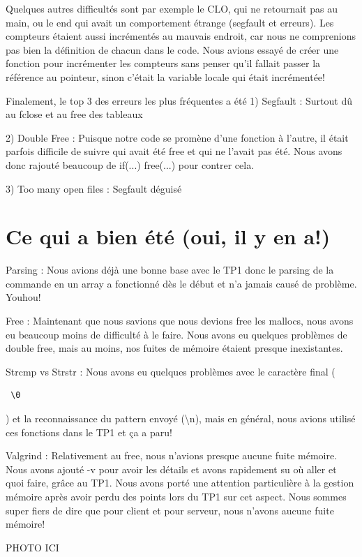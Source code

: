 \documentclass[11pt]{article}
\begin{document}
Quelques autres difficultés sont par exemple le CLO, qui ne retournait pas au main, ou le end qui avait un comportement étrange (segfault et erreurs). Les compteurs étaient aussi incrémentés au mauvais endroit, car nous ne comprenions pas bien la définition de chacun dans le code. Nous avions essayé de créer une fonction pour incrémenter les compteurs sans penser qu’il fallait passer la référence au pointeur, sinon c’était la variable locale qui était incrémentée!

Finalement, le top 3 des erreurs les plus fréquentes a été
1) Segfault : Surtout dû au fclose et au free des tableaux

2) Double Free : Puisque notre code se promène d’une fonction à l’autre, il était parfois difficile de suivre qui avait été free et qui ne l’avait pas été. Nous avons donc rajouté beaucoup de if(...) free(...) pour contrer cela.

3) Too many open files : Segfault déguisé


\section{Ce qui a bien été (oui, il y en a!)}

Parsing : Nous avions déjà une bonne base avec le TP1 donc le parsing de la commande en un array a fonctionné dès le début et n’a jamais causé de problème. Youhou!

Free : Maintenant que nous savions que nous devions free les mallocs, nous avons eu beaucoup moins de difficulté à le faire. Nous avons eu quelques problèmes de double free, mais au moins, nos fuites de mémoire étaient presque inexistantes.

Strcmp vs Strstr : Nous avons eu quelques problèmes avec le caractère final (\begin{verbatim} \0 \end{verbatim}) et la reconnaissance du pattern envoyé (\textbackslash n), mais en général, nous avions utilisé ces fonctions dans le TP1 et ça a paru!

Valgrind : Relativement au free, nous n’avions presque aucune fuite mémoire. Nous avons ajouté -v pour avoir les détails et avons rapidement su où aller et quoi faire, grâce au TP1. Nous avons porté une attention particulière à la gestion mémoire après avoir perdu des points lors du TP1 sur cet aspect. Nous sommes super fiers de dire que pour client et pour serveur, nous n’avons aucune fuite mémoire! 

PHOTO ICI
\end{document}

